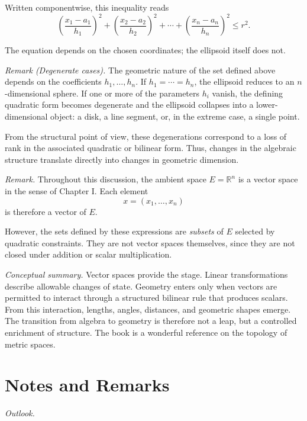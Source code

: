 Written componentwise, this inequality reads
\[
\left(\frac{x_1-a_1}{h_1}\right)^2
+
\left(\frac{x_2-a_2}{h_2}\right)^2
+
\cdots
+
\left(\frac{x_n-a_n}{h_n}\right)^2
\le r^2.
\]

The equation depends on the chosen coordinates; the ellipsoid itself does not.

\medskip

\emph{Remark (Degenerate cases).}
The geometric nature of the set defined above depends on the coefficients
$h_1,\dots,h_n$.
If $h_1=\cdots=h_n$, the ellipsoid reduces to an $n$-dimensional sphere.
If one or more of the parameters $h_i$ vanish, the defining quadratic form
becomes degenerate and the ellipsoid collapses into a lower-dimensional
object: a disk, a line segment, or, in the extreme case, a single point.

\medskip

From the structural point of view, these degenerations correspond to a loss of
rank in the associated quadratic or bilinear form.
Thus, changes in the algebraic structure translate directly into changes in
geometric dimension.

\medskip

\emph{Remark.}
Throughout this discussion, the ambient space $E=\mathbb{R}^n$ is a vector
space in the sense of Chapter I.
Each element
\[
x=(x_1,\dots,x_n)
\]
is therefore a vector of $E$.

\medskip

However, the sets defined by these expressions are \emph{subsets} of $E$
selected by quadratic constraints.
They are not vector spaces themselves, since they are not closed under
addition or scalar multiplication.

\bigskip

\textit{Conceptual summary.}
Vector spaces provide the stage.
Linear transformations describe allowable changes of state.
Geometry enters only when vectors are permitted to interact through a
structured bilinear rule that produces scalars.
From this interaction, lengths, angles, distances, and geometric shapes emerge.
The transition from algebra to geometry is therefore not a leap, but a
controlled enrichment of structure.
The book \cite{iribarren2} is a wonderful reference on the topology of metric
spaces.

\section*{Notes and Remarks}

\textit{Outlook.}

